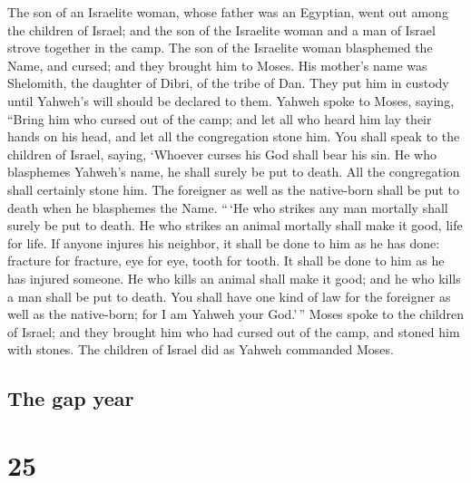  The son of an Israelite woman, whose father was an
Egyptian, went out among the children of Israel; and the son of the
Israelite woman and a man of Israel strove together in the camp.
 The son of the Israelite woman blasphemed the Name, and
cursed; and they brought him to Moses. His mother's name was Shelomith,
the daughter of Dibri, of the tribe of Dan.  They put him
in custody until Yahweh's will should be declared to them.
 Yahweh spoke to Moses, saying,  ``Bring
him who cursed out of the camp; and let all who heard him lay their
hands on his head, and let all the congregation stone him.
 You shall speak to the children of Israel, saying,
`Whoever curses his God shall bear his sin.  He who
blasphemes Yahweh's name, he shall surely be put to death. All the
congregation shall certainly stone him. The foreigner as well as the
native-born shall be put to death when he blasphemes the Name.
 ``\,`He who strikes any man mortally shall surely be put
to death.  He who strikes an animal mortally shall make
it good, life for life.  If anyone injures his neighbor,
it shall be done to him as he has done:  fracture for
fracture, eye for eye, tooth for tooth. It shall be done to him as he
has injured someone.  He who kills an animal shall make
it good; and he who kills a man shall be put to death. 
You shall have one kind of law for the foreigner as well as the
native-born; for I am Yahweh your God.'\,''  Moses spoke
to the children of Israel; and they brought him who had cursed out of
the camp, and stoned him with stones. The children of Israel did as
Yahweh commanded Moses.

\hypertarget{the-gap-year}{%
\subsection{The gap year}\label{the-gap-year}}

\hypertarget{section-24}{%
\section{25}\label{section-24}}

